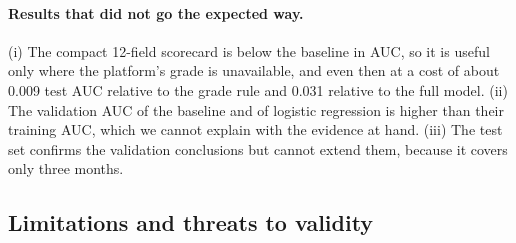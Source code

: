 \paragraph{Results that did not go the expected way.} (i) The compact 12-field scorecard is below the baseline in AUC, so it is useful only where the platform's grade is unavailable, and even then at a cost of about 0.009 test AUC relative to the grade rule and 0.031 relative to the full model. (ii) The validation AUC of the baseline and of logistic regression is higher than their training AUC, which we cannot explain with the evidence at hand. (iii) The test set confirms the validation conclusions but cannot extend them, because it covers only three months.

\subsection{Limitations and threats to validity}
\label{sec:limits}

